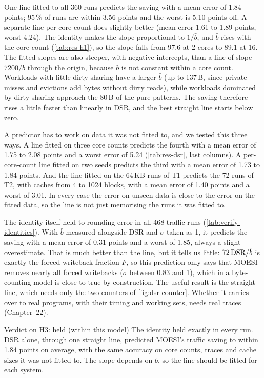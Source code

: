 One line fitted to all 360 runs predicts the saving with a mean error of 1.84
points; 95\,\% of runs are within 3.56 points and the worst is 5.10 points off. A
separate line per core count does slightly better (mean error 1.61 to 1.89 points,
worst 4.24). The identity makes the slope proportional to $1/\bar b$, and $\bar b$
rises with the core count (\cref{tab:res-h1}), so the slope falls from 97.6 at 2
cores to 89.1 at 16. The fitted slopes are also steeper, with negative intercepts,
than a line of slope $7200/\bar b$ through the origin, because $\bar b$ is not
constant within a core count. Workloads with little dirty sharing have a larger
$\bar b$ (up to 137\,B, since private misses and evictions add bytes without dirty
reads), while workloads dominated by dirty sharing approach the 80\,B of the pure
patterns. The saving therefore rises a little faster than linearly in DSR, and the
best straight line starts below zero.

A predictor has to work on data it was not fitted to, and we tested this three
ways. A line fitted on three core counts predicts the fourth with a mean error of
1.75 to 2.08 points and a worst error of 5.24 (\cref{tab:res-dsr}, last columns). A
per-core-count line fitted on two seeds predicts the third with a mean error of 1.73
to 1.84 points. And the line fitted on the 64\,KB runs of T1 predicts the 72 runs
of T2, with caches from 4 to 1024 blocks, with a mean error of 1.40 points and a
worst of 3.01. In every case the error on unseen data is close to the error on the
fitted data, so the line is not just memorising the runs it was fitted to.

The identity itself held to rounding error in all 468 traffic runs
(\cref{tab:verify-identities}). With $\bar b$ measured alongside DSR and $\sigma$
taken as 1, it predicts the saving with a mean error of 0.31 points and a worst of
1.85, always a slight overestimate. That is much better than the line, but it tells
us little: $72\,\mathrm{DSR}/\bar b$ is exactly the forced-writeback fraction $F$, so this
prediction only says that MOESI removes nearly all forced writebacks ($\sigma$
between 0.83 and 1), which in a byte-counting model is close to true by
construction. The useful result is the straight line, which needs only the two
counters of \cref{fig:dsr-counter}. Whether it carries over to real programs, with
their timing and working sets, needs real traces (Chapter~22).

\begin{verdictbox}{Verdict on H3: held (within this model)}
The identity held exactly in every run. DSR alone, through one straight line,
predicted MOESI's traffic saving to within 1.84 points on average, with the same
accuracy on core counts, traces and cache sizes it was not fitted to. The slope
depends on $\bar b$, so the line should be fitted for each system.
\end{verdictbox}

